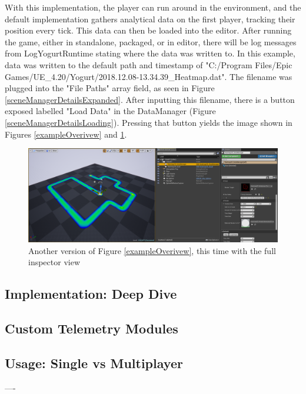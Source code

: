 \documentclass[journal]{IEEEtran}
\begin{document}
With this implementation, the player can run around in the environment, and the default implementation gathers analytical data on the first player, tracking their position every tick. This data can then be loaded into the editor. After running the game, either in standalone, packaged, or in editor, there will be log messages from LogYogurtRuntime stating where the data was written to. In this example, data was written to the default path and timestamp of "C:/Program Files/Epic Games/UE\_4.20/Yogurt/2018.12.08-13.34.39\_Heatmap.dat". The filename was plugged into the "File Paths" array field, as seen in Figure \ref{sceneManagerDetailsExpanded}. After inputting this filename, there is a button exposed labelled "Load Data" in the DataManager (Figure \ref{sceneManagerDetailsLoading}). Pressing that button yields the image shown in Figures \ref{exampleOverivew} and \ref{exampleOverivewLarge}.

\begin{figure}
\includegraphics[width=\textwidth]{"scene_yogurt_postrun"}
\caption{Another version of Figure \ref{exampleOverivew}, this time with the full inspector view}
\label{exampleOverivewLarge}
\end{figure}

\subsection{Implementation: Deep Dive}

\subsection{Custom Telemetry Modules}

\subsection{Usage: Single vs Multiplayer}

----
\end{document}
